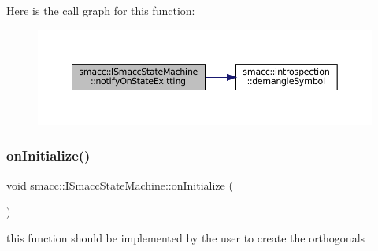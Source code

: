 Here is the call graph for this function\+:
\nopagebreak
\begin{figure}[H]
\begin{center}
\leavevmode
\includegraphics[width=350pt]{classsmacc_1_1ISmaccStateMachine_a707c36f8b02eeed1af624dd36a5a4957_cgraph}
\end{center}
\end{figure}
\mbox{\label{classsmacc_1_1ISmaccStateMachine_ac2982c6c8283663e5e1e8a7c82f511ec}} 
\subsubsection{\texorpdfstring{on\+Initialize()}{onInitialize()}}
{\footnotesize\ttfamily void smacc\+::\+I\+Smacc\+State\+Machine\+::on\+Initialize (\begin{DoxyParamCaption}{ }\end{DoxyParamCaption})\hspace{0.3cm}{\ttfamily [virtual]}}



this function should be implemented by the user to create the orthogonals 



